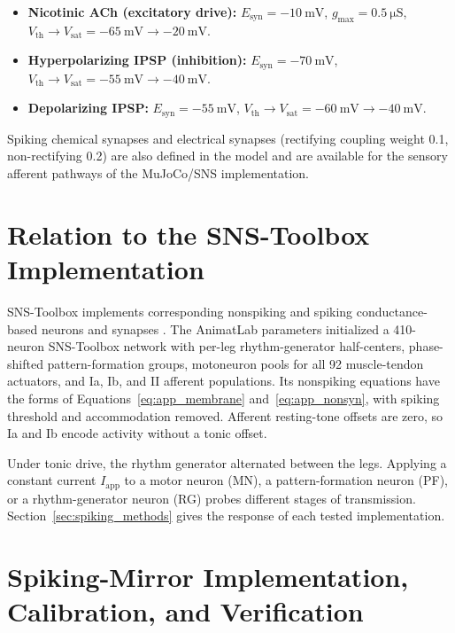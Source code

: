 \begin{itemize}
    \item \textbf{Nicotinic ACh (excitatory drive):}
          $E_{\text{syn}} = \qty{-10}{\mV}$,
          $g_{\text{max}} = \qty{0.5}{\micro\siemens}$,
          $V_{\text{th}} \to V_{\text{sat}} = \qty{-65}{\mV} \to \qty{-20}{\mV}$.
    \item \textbf{Hyperpolarizing IPSP (inhibition):}
          $E_{\text{syn}} = \qty{-70}{\mV}$,
          $V_{\text{th}} \to V_{\text{sat}} = \qty{-55}{\mV} \to \qty{-40}{\mV}$.
    \item \textbf{Depolarizing IPSP:}
          $E_{\text{syn}} = \qty{-55}{\mV}$,
          $V_{\text{th}} \to V_{\text{sat}} = \qty{-60}{\mV} \to \qty{-40}{\mV}$.
\end{itemize}

Spiking chemical synapses and electrical synapses (rectifying coupling weight 0.1, non-rectifying 0.2) are also defined in the model and are available for the sensory afferent pathways of the MuJoCo/SNS implementation.

\section{Relation to the SNS-Toolbox Implementation}

SNS-Toolbox implements corresponding nonspiking and spiking conductance-based neurons and synapses \citep{nourse_sns_2023}. The AnimatLab parameters initialized a 410-neuron SNS-Toolbox network with per-leg rhythm-generator half-centers, phase-shifted pattern-formation groups, motoneuron pools for all 92 muscle-tendon actuators, and Ia, Ib, and II afferent populations. Its nonspiking equations have the forms of Equations~\eqref{eq:app_membrane} and~\eqref{eq:app_nonsyn}, with spiking threshold and accommodation removed. Afferent resting-tone offsets are zero, so Ia and Ib encode activity without a tonic offset.

Under tonic drive, the rhythm generator alternated between the legs. Applying a constant current $I_{\text{app}}$ to a motor neuron (MN), a pattern-formation neuron (PF), or a rhythm-generator neuron (RG) probes different stages of transmission. Section~\ref{sec:spiking_methods} gives the response of each tested implementation.

\section{Spiking-Mirror Implementation, Calibration, and Verification}\label{app:spiking_details}

